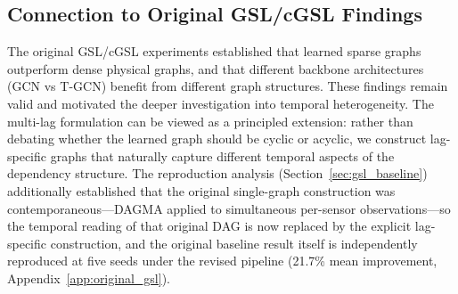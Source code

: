 \subsection{Connection to Original GSL/cGSL Findings}

The original GSL/cGSL experiments established that learned sparse graphs outperform dense physical graphs, and that different backbone architectures (GCN vs T-GCN) benefit from different graph structures. These findings remain valid and motivated the deeper investigation into temporal heterogeneity. The multi-lag formulation can be viewed as a principled extension: rather than debating whether the learned graph should be cyclic or acyclic, we construct lag-specific graphs that naturally capture different temporal aspects of the dependency structure. The reproduction analysis (Section~\ref{sec:gsl_baseline}) additionally established that the original single-graph construction was contemporaneous---DAGMA applied to simultaneous per-sensor observations---so the temporal reading of that original DAG is now replaced by the explicit lag-specific construction, and the original baseline result itself is independently reproduced at five seeds under the revised pipeline (21.7\% mean improvement, Appendix~\ref{app:original_gsl}).


